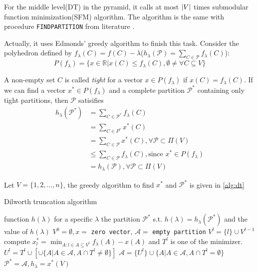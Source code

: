 \documentclass{article}
\def\R{\mathbb{R}}
\def\P{\mathcal{P}}
\DeclarePairedDelimiter\abs{\lvert}{\rvert}
\theoremstyle{definition}
\begin{document}
For the middle level(DT) in the pyramid, it calls at most $\abs{V}$ times submodular function minimization(SFM) algorithm.
The algorithm is the same with procedure \texttt{FINDPARTITION} from literature \cite{mac}.

Actually, it uses Edmonds' greedy algorithm to finish this task. Consider the polyhedron defined by $f_{\lambda}(C) = f(C)-\lambda$($h_{\lambda}(\P)= \sum_{C \in \P} f_{\lambda}(C)$):
\begin{equation}
P(f_{\lambda}) = \{ x \in \R |  x(C) \leq f_{\lambda}(C), \emptyset \neq \forall C \subseteq V\}
\end{equation}

A non-empty set $C$ is called \textit{tight} for a vector $x \in P(f_{\lambda})$ if $x(C) = f_{\lambda}(C)$.
If we can find a vector $ x^* \in P(f_{\lambda}) $ and a complete partition $\P^*$ containing only tight partitions,
then $\P$ satisifies
\begin{align*}
h_{\lambda}(\P^*) &= \sum_{C \in \P^*} f_{\lambda}(C) \\
 &=\sum_{C\in P^*} x^*(C)  \\
& = \sum_{C \in \P} x^*(C), \forall \P \subset \Pi(V) \\
& \leq \sum_{C\in \P} f_{\lambda}(C), \textrm{since } x^* \in P(f_{\lambda}) \\
& = h_{\lambda}(\P),\forall \P \subset \Pi(V) 
\end{align*}

Let $V=\{1, 2, \dots, n\}$, the greedy algorithm to find $x^*$ and $\P^*$ is given in \ref{alg:dt}
\begin{algorithm}
\caption{Dilworth truncation algorithm}\label{alg:dt}
\begin{algorithmic}[1]
\REQUIRE function $h(\lambda)$ for a specific $\lambda$
\ENSURE the partition $\P^*$ s.t. $h(\lambda) = h_{\lambda}(\P^*)$ and the value of $h(\lambda)$
\STATE $V^0 = \emptyset, x = $ \texttt{zero vector}, $\mathcal{A} = $ \texttt{empty partition} 
\STATE $V^l = \{l\} \cup V^{l-1}$
\STATE\label{alg:tight} compute $x^*_l = \displaystyle\min_{ A: l \in A \subseteq V^l} f_{\lambda}(A)- x(A)$ and $T^l$ is one of the minimizer.
\STATE $U^l = T^l \cup [\cup \{A | A \in \mathcal{A}, A \cap T^l \neq \emptyset\}] $
\STATE $\mathcal{A} = \{U^l\} \cup \{A | A \in \mathcal{A}, A \cap T^l = \emptyset \}$
\ENDFOR
\STATE $\P^* = \mathcal{A}, h_{\lambda} = x^*(V)$
\end{algorithmic}
\end{algorithm}
\end{document}
